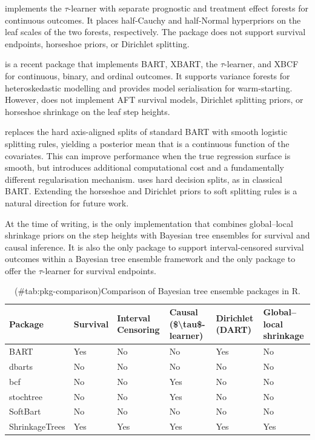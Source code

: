  \citep{hahn2020bayesian} implements the \(\tau\)-learner with separate prognostic and treatment effect forests for continuous outcomes. It places half-Cauchy and half-Normal hyperpriors on the leaf scales of the two forests, respectively. The package does not support survival endpoints, horseshoe priors, or Dirichlet splitting.

 is a recent package that implements BART, XBART, the \(\tau\)-learner, and XBCF for continuous, binary, and ordinal outcomes. It supports variance forests for heteroskedastic modelling and provides model serialisation for warm-starting. However,  does not implement AFT survival models, Dirichlet splitting priors, or horseshoe shrinkage on the leaf step heights.

 \citep{linero2018softbart} replaces the hard axis-aligned splits of standard BART with smooth logistic splitting rules, yielding a posterior mean that is a continuous function of the covariates. This can improve performance when the true regression surface is smooth, but introduces additional computational cost and a fundamentally different regularisation mechanism.  uses hard decision splits, as in classical BART. Extending the horseshoe and Dirichlet priors to soft splitting rules is a natural direction for future work.

At the time of writing,  is the only implementation that combines global--local shrinkage priors on the step heights with Bayesian tree ensembles for survival and causal inference. It is also the only package to support interval-censored survival outcomes within a Bayesian tree ensemble framework and the only package to offer the \(\tau\)-learner for survival endpoints.

\begin{table}[!h]
\centering
\caption{(\#tab:pkg-comparison)Comparison of Bayesian tree ensemble packages in R.}
\centering
\fontsize{9}{11}\selectfont
\begin{tabular}[t]{>{\raggedright\arraybackslash}p{2.2cm}>{\raggedright\arraybackslash}p{1.4cm}>{\raggedright\arraybackslash}p{1.4cm}>{\raggedright\arraybackslash}p{1.4cm}>{\raggedright\arraybackslash}p{1.4cm}>{\raggedright\arraybackslash}p{1.4cm}}
\toprule
Package & Survival & Interval
Censoring & Causal
(\$\textbackslash{}tau\$-learner) & Dirichlet
(DART) & Global--local
shrinkage\\
\midrule
BART & Yes & No & No & Yes & No\\
dbarts & No & No & No & No & No\\
bcf & No & No & Yes & No & No\\
stochtree & No & No & Yes & No & No\\
SoftBart & No & No & No & No & No\\
\addlinespace
ShrinkageTrees & Yes & Yes & Yes & Yes & Yes\\
\bottomrule
\end{tabular}
\end{table}

